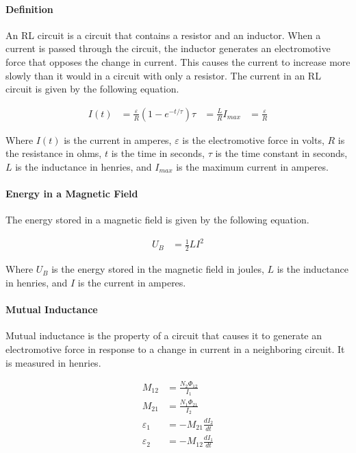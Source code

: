 \paragraph*{Definition}
An RL circuit is a circuit that contains a resistor and an inductor. When a current is passed through the circuit, the inductor generates
an electromotive force that opposes the change in current. This causes the current to increase more slowly than it would in a circuit with
only a resistor. The current in an RL circuit is given by the following equation.

\begin{align*}
    I(t) &= \frac{\varepsilon}{R}(1 - e^{-t/\tau})
    \tau &= \frac{L}{R}
    I_{max} &= \frac{\varepsilon}{R} 
\end{align*}

Where $I(t)$ is the current in amperes, $\varepsilon$ is the electromotive force in volts, $R$ is the resistance in ohms, $t$ is the time in seconds,
$\tau$ is the time constant in seconds, $L$ is the inductance in henries, and $I_{max}$ is the maximum current in amperes.\\

\paragraph*{Energy in a Magnetic Field}
The energy stored in a magnetic field is given by the following equation.

\begin{align*}
    U_B &= \frac{1}{2}LI^2
\end{align*}

Where $U_B$ is the energy stored in the magnetic field in joules, $L$ is the inductance in henries, and $I$ is the current in amperes.\\

\paragraph*{Mutual Inductance}
Mutual inductance is the property of a circuit that causes it to generate an electromotive force in response to a change in current in a
neighboring circuit. It is measured in henries. 

\begin{align*}
    M_{12} &= \frac{N_2\Phi_12}{I_1}\\
    M_{21} &= \frac{N_1\Phi_21}{I_2}\\
    \varepsilon_1 &= -M_{21}\frac{dI_2}{dt}\\
    \varepsilon_2 &= -M_{12} \frac{dI_1}{dt}
\end{align*}